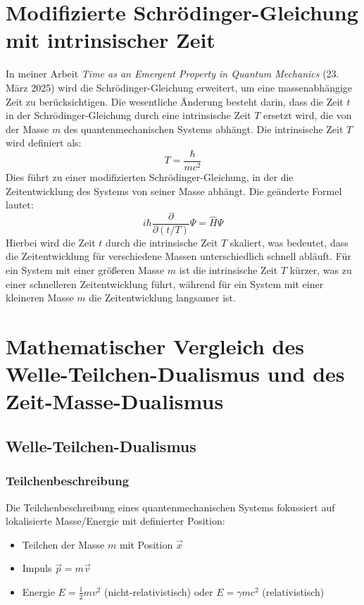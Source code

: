 \documentclass[a4paper,12pt]{article}
\begin{document}
	\section{Modifizierte Schrödinger-Gleichung mit intrinsischer Zeit}
	In meiner Arbeit \textit{Time as an Emergent Property in Quantum Mechanics} (23. März 2025) wird die Schrödinger-Gleichung erweitert, um eine massenabhängige Zeit zu berücksichtigen. Die wesentliche Änderung besteht darin, dass die Zeit \( t \) in der Schrödinger-Gleichung durch eine intrinsische Zeit \( T \) ersetzt wird, die von der Masse \( m \) des quantenmechanischen Systems abhängt. Die intrinsische Zeit \( T \) wird definiert als:
	\[
	T = \frac{\hbar}{m c^2}
	\]
	Dies führt zu einer modifizierten Schrödinger-Gleichung, in der die Zeitentwicklung des Systems von seiner Masse abhängt. Die geänderte Formel lautet:
	\[
	i\hbar \frac{\partial}{\partial (t/T)} \Psi = \hat{H} \Psi
	\]
	Hierbei wird die Zeit \( t \) durch die intrinsische Zeit \( T \) skaliert, was bedeutet, dass die Zeitentwicklung für verschiedene Massen unterschiedlich schnell abläuft. Für ein System mit einer größeren Masse \( m \) ist die intrinsische Zeit \( T \) kürzer, was zu einer schnelleren Zeitentwicklung führt, während für ein System mit einer kleineren Masse \( m \) die Zeitentwicklung langsamer ist.
	
	\section{Mathematischer Vergleich des Welle-Teilchen-Dualismus und des Zeit-Masse-Dualismus}
	
	\subsection{Welle-Teilchen-Dualismus}
	
	\subsubsection{Teilchenbeschreibung}
	Die Teilchenbeschreibung eines quantenmechanischen Systems fokussiert auf lokalisierte Masse/Energie mit definierter Position:
	\begin{itemize}
		\item Teilchen der Masse \( m \) mit Position \( \vec{x} \)
		\item Impuls \( \vec{p} = m\vec{v} \)
		\item Energie \( E = \frac{1}{2}mv^2 \) (nicht-relativistisch) oder \( E = \gamma mc^2 \) (relativistisch)
	\end{itemize}
	
\end{document}
